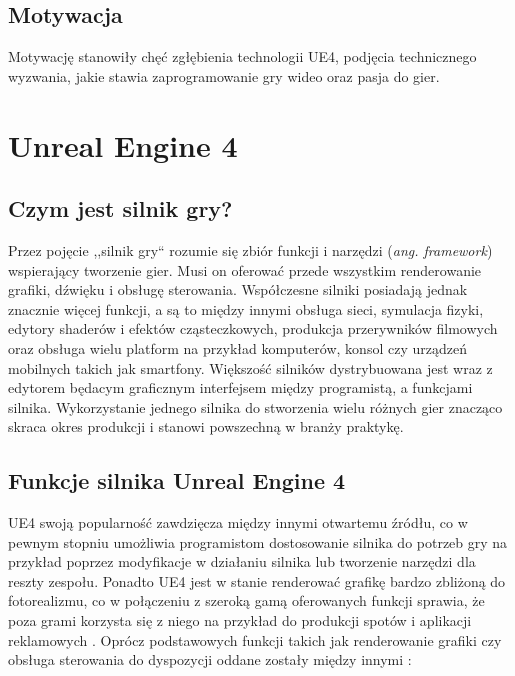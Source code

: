 \documentclass[multip]{SGGW-thesis}
\begin{document}
\section{Motywacja}
Motywację stanowiły chęć zgłębienia technologii UE4, podjęcia technicznego wyzwania, jakie stawia zaprogramowanie gry wideo oraz pasja do gier.
\chapter{Unreal Engine 4}
\section{Czym jest silnik gry?}
Przez pojęcie ,,silnik gry`` rozumie się zbiór funkcji i narzędzi ({\em ang. framework}) wspierający tworzenie gier. Musi on oferować przede wszystkim renderowanie grafiki, dźwięku i obsługę sterowania. Współczesne silniki posiadają jednak znacznie więcej funkcji, a są to między innymi obsługa sieci, symulacja fizyki, edytory shaderów i efektów cząsteczkowych, produkcja przerywników filmowych oraz obsługa wielu platform na przykład komputerów, konsol czy urządzeń mobilnych takich jak smartfony. Większość silników dystrybuowana jest wraz z edytorem będacym graficznym interfejsem między programistą, a funkcjami silnika. Wykorzystanie jednego silnika do stworzenia wielu różnych gier znacząco skraca okres produkcji i stanowi powszechną w branży praktykę\cite{learning-unreal}\cite{wiki-game-engine}.

\section{Funkcje silnika Unreal Engine 4}
UE4 swoją popularność zawdzięcza między innymi otwartemu źródłu, co w pewnym stopniu umożliwia programistom dostosowanie silnika do potrzeb gry na przykład poprzez modyfikacje w działaniu silnika lub tworzenie narzędzi dla reszty zespołu. Ponadto UE4 jest w stanie renderować grafikę bardzo zbliżoną do fotorealizmu, co w połączeniu z szeroką gamą oferowanych funkcji sprawia, że poza grami korzysta się z niego na przykład do produkcji spotów i aplikacji reklamowych \cite{the-human-race}\cite{ikea-vr}.
\newline \indent Oprócz podstawowych funkcji takich jak renderowanie grafiki czy obsługa sterowania do dyspozycji oddane zostały między innymi \cite{docs-ue4-features}:
\end{document}
